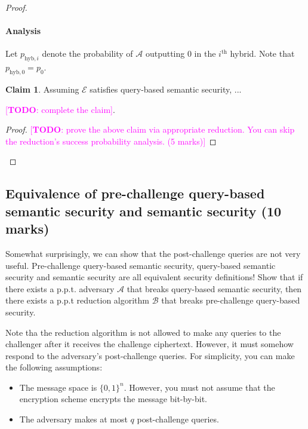 \documentclass[10pt,addpoints]{exam}
\newcommand{\calA}{\mathcal{A}}
\newcommand{\calB}{\mathcal{B}}
\newcommand{\calE}{\mathcal{E}}
\newcommand{\thh}{^{\mathrm{th}}}
\newcommand{\TODO}[1]{\textcolor{magenta}{[\textbf{TODO}: #1]}}
\newcommand{\phybb}[1]{p_{\mathrm{hyb}, #1}}
\theoremstyle{definition}
\newtheorem{claim}[theorem]{Claim}
\begin{document}
\begin{proof}
            \paragraph{Analysis}


            Let $\phybb{i}$ denote the probability of $\calA$ outputting $0$ in the $i\thh$ hybrid. Note that $\phybb{0} = p_0$.

            \begin{claim}
                Assuming $\calE$ satisfies query-based semantic security, ...

                \TODO{complete the claim}.
            \end{claim}

            \begin{proof}

                \TODO{prove the above claim via appropriate reduction. You can skip the reduction's success probability analysis. (5 marks)}
            \end{proof}

        \end{proof}

    \color{blue}
    \subsection{Equivalence of pre-challenge query-based semantic security and semantic security (10 marks)}
        Somewhat surprisingly, we can show that the post-challenge queries are not very useful. Pre-challenge query-based semantic security, query-based semantic security and semantic security are all equivalent security definitions! Show that if there exists a p.p.t. adversary $\calA$ that breaks query-based semantic security, then there exists a p.p.t reduction algorithm $\calB$ that breaks pre-challenge query-based security. 

        
        \vspace{10pt}

        Note tha the reduction algorithm is not allowed to make any queries to the challenger after it receives the challenge ciphertext. However, it must somehow respond to the adversary's post-challenge queries. For simplicity, you can make the following assumptions:
        \begin{itemize}[noitemsep]
            \item The message space is $\{0,1\}^n$. However, you must not assume that the encryption scheme encrypts the message bit-by-bit. 
            \item The adversary makes at most $q$ post-challenge queries. 
        \end{itemize}
\end{document}
